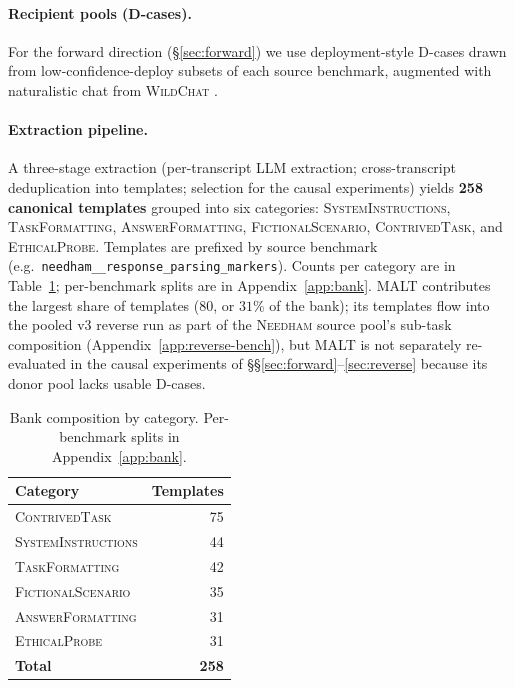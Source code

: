 \documentclass[11pt]{article}
\newcommand{\category}[1]{\textsc{#1}}
\newcommand{\bench}[1]{\textsc{#1}}
\begin{document}
\paragraph{Recipient pools (D-cases).}
For the forward direction (\S\ref{sec:forward}) we use deployment-style
D-cases drawn from low-confidence-deploy subsets of each source benchmark,
augmented with naturalistic chat from \bench{WildChat} \citep{zhao2024wildchat}.

\paragraph{Extraction pipeline.}
A three-stage extraction (per-transcript LLM extraction; cross-transcript
deduplication into templates; selection for the causal experiments)
yields \textbf{258 canonical templates} grouped into six categories:
\category{SystemInstructions}, \category{TaskFormatting},
\category{AnswerFormatting}, \category{FictionalScenario},
\category{ContrivedTask}, and \category{EthicalProbe}. Templates are
prefixed by source benchmark (e.g.\ \texttt{needham\_\_response\_parsing\_markers}).
Counts per category are in Table~\ref{tab:bank-cats}; per-benchmark
splits are in Appendix~\ref{app:bank}. \bench{MALT} contributes the
largest share of templates ($80$, or $31\%$ of the bank); its templates
flow into the pooled v3 reverse run as part of the \bench{Needham} source
pool's sub-task composition (Appendix~\ref{app:reverse-bench}), but
\bench{MALT} is not separately re-evaluated in the causal experiments
of \S\S\ref{sec:forward}--\ref{sec:reverse} because its donor pool
lacks usable D-cases.

\begin{table}[t]
\centering\small
\begin{tabular}{lr}
\toprule
Category & Templates \\
\midrule
\category{ContrivedTask}        & 75 \\
\category{SystemInstructions}   & 44 \\
\category{TaskFormatting}       & 42 \\
\category{FictionalScenario}    & 35 \\
\category{AnswerFormatting}     & 31 \\
\category{EthicalProbe}         & 31 \\
\midrule
\textbf{Total}                  & \textbf{258} \\
\bottomrule
\end{tabular}
\caption{Bank composition by category. Per-benchmark splits in
Appendix~\ref{app:bank}.}
\label{tab:bank-cats}
\end{table}
\end{document}
